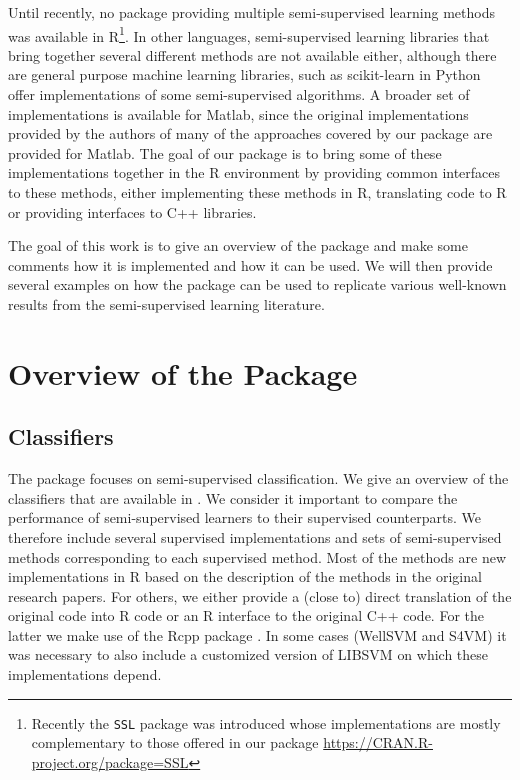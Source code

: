 \documentclass[runningheads,a4paper]{llncs}\usepackage[]{graphicx}\usepackage[]{color}
\begin{document}
Until recently, no package providing multiple semi-supervised learning methods was available in R\footnote{Recently the \texttt{SSL} package was introduced whose implementations are mostly complementary to those offered in our package \url{https://CRAN.R-project.org/package=SSL}}. In other languages, semi-supervised learning libraries that bring together several different methods are not available either, although there are general purpose machine learning libraries, such as scikit-learn in Python \cite{scikit-learn} offer implementations of some semi-supervised algorithms. A broader set of implementations is available for Matlab, since the original implementations provided by the authors of many of the approaches covered by our package are provided for Matlab. The goal of our package is to bring some of these implementations together in the R environment by providing common interfaces to these methods, either implementing these methods in R, translating code to R or providing interfaces to C++ libraries.

The goal of this work is to give an overview of the package and make some comments how it is implemented and how it can be used. We will then provide several examples on how the package can be used to replicate various well-known results from the semi-supervised learning literature.

\section{Overview of the Package}

\subsection{Classifiers}
The package focuses on semi-supervised classification. We give an overview of the classifiers that are available in . We consider it important to compare the performance of semi-supervised learners to their supervised counterparts. We therefore include several supervised implementations and sets of semi-supervised methods corresponding to each supervised method. Most of the methods are new implementations in R based on the description of the methods in the original research papers. For others, we either provide a (close to) direct translation of the original code into R code or an R interface to the original C++ code. For the latter we make use of the Rcpp package \cite{Eddelbuettel2011}. In some cases (WellSVM and S4VM) it was necessary to also include a customized version of LIBSVM \cite{Chang2011} on which these implementations depend.
\end{document}
